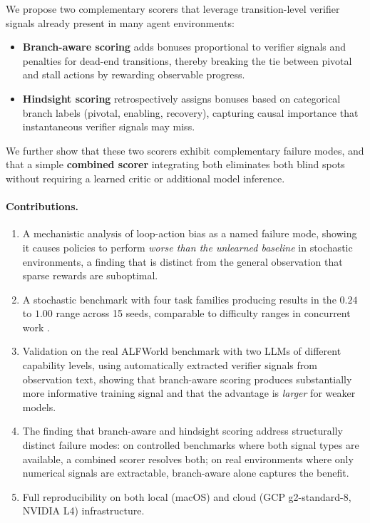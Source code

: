 \documentclass[11pt]{article}
\begin{document}
We propose two complementary scorers that leverage transition-level verifier signals already present in many agent environments:
\begin{itemize}[nosep]
  \item \textbf{Branch-aware scoring} adds bonuses proportional to verifier signals and penalties for dead-end transitions, thereby breaking the tie between pivotal and stall actions by rewarding observable progress.
  \item \textbf{Hindsight scoring} retrospectively assigns bonuses based on categorical branch labels (pivotal, enabling, recovery), capturing causal importance that instantaneous verifier signals may miss.
\end{itemize}
We further show that these two scorers exhibit complementary failure modes, and that a simple \textbf{combined scorer} integrating both eliminates both blind spots without requiring a learned critic or additional model inference.

\paragraph{Contributions.}
\begin{enumerate}[nosep]
  \item A mechanistic analysis of loop-action bias as a named failure mode, showing it causes policies to perform \emph{worse than the unlearned baseline} in stochastic environments, a finding that is distinct from the general observation that sparse rewards are suboptimal.
  \item A stochastic benchmark with four task families producing results in the $0.24$ to $1.00$ range across 15 seeds, comparable to difficulty ranges in concurrent work \citep{tan2026hindsight,choudhury2025process,song2024trial}.
  \item Validation on the real ALFWorld benchmark \citep{shridhar2021alfworld} with two LLMs of different capability levels, using automatically extracted verifier signals from observation text, showing that branch-aware scoring produces substantially more informative training signal and that the advantage is \emph{larger} for weaker models.
  \item The finding that branch-aware and hindsight scoring address structurally distinct failure modes: on controlled benchmarks where both signal types are available, a combined scorer resolves both; on real environments where only numerical signals are extractable, branch-aware alone captures the benefit.
  \item Full reproducibility on both local (macOS) and cloud (GCP g2-standard-8, NVIDIA L4) infrastructure.
\end{enumerate}
\end{document}
